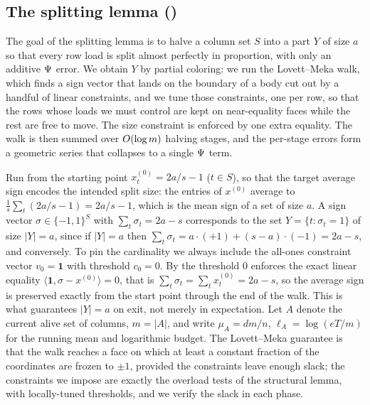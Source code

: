 \subsection{The splitting lemma ()}\label{app:split-full}

The goal of the splitting lemma is to halve a column set $S$ into a part $Y$ of size $a$ so that every row load is split
almost perfectly in proportion, with only an additive $\Psi$ error. We obtain $Y$ by partial coloring: we run the
Lovett--Meka walk, which finds a sign vector that lands on the boundary of a body cut out by a handful of linear
constraints, and we tune those constraints, one per row, so that the rows whose loads we must control are kept on
near-equality faces while the rest are free to move. The size constraint is enforced by one extra equality. The walk is
then summed over $O(\log m)$ halving stages, and the per-stage errors form a geometric series that collapses to a single
$\Psi$ term.

Run  from the starting point $x^{(0)}_t=2a/s-1$ ($t\in S$), so that the target average sign encodes the
intended split size: the entries of $x^{(0)}$ average to $\tfrac1s\sum_t(2a/s-1)=2a/s-1$, which is the mean sign of a set of
size $a$. A sign vector $\sigma\in\{-1,1\}^S$ with $\sum_t\sigma_t=2a-s$ corresponds to the set $Y=\{t:\sigma_t=1\}$ of size
$|Y|=a$, since if $|Y|=a$ then $\sum_t\sigma_t=a\cdot(+1)+(s-a)\cdot(-1)=2a-s$, and conversely. To pin the cardinality we
always include the all-ones constraint vector $v_0=\mathbf 1$ with threshold $c_0=0$. By  the threshold $0$
enforces the exact linear equality $\langle\mathbf 1,\sigma-x^{(0)}\rangle=0$, that is $\sum_t\sigma_t=\sum_t x^{(0)}_t=2a-s$,
so the average sign is preserved exactly from the start point through the end of the walk. This is what guarantees $|Y|=a$ on
exit, not merely in expectation. Let $A$
denote the current alive set of columns, $m=|A|$, and write $\mu_A=dm/n$, $\ell_A=\log(eT/m)$ for the running mean and
logarithmic budget. The Lovett--Meka guarantee is that the walk reaches a face on which at least a constant fraction of the
coordinates are frozen to $\pm1$, provided the constraints leave enough slack; the constraints we impose are exactly the
overload tests of the structural lemma, with locally-tuned thresholds, and we verify the slack in each phase.

